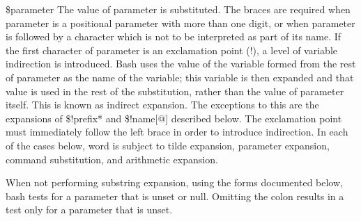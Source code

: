 \${parameter}
The value of parameter is substituted. The braces are required when parameter is a positional parameter with more than one digit, or when parameter is followed by a character which is not to be interpreted as part of its name.
If the first character of parameter is an exclamation point (!), a level of variable indirection is introduced. Bash uses the value of the variable formed from the rest of parameter as the name of the variable; this variable is then expanded and that value is used in the rest of the substitution, rather than the value of parameter itself. This is known as indirect expansion. The exceptions to this are the expansions of \${!prefix*} and \${!name[@]} described below. The exclamation point must immediately follow the left brace in order to introduce indirection.
In each of the cases below, word is subject to tilde expansion, parameter expansion, command substitution, and arithmetic expansion.

When not performing substring expansion, using the forms documented below, bash tests for a parameter that is unset or null. Omitting the colon results in a test only for a parameter that is unset.

